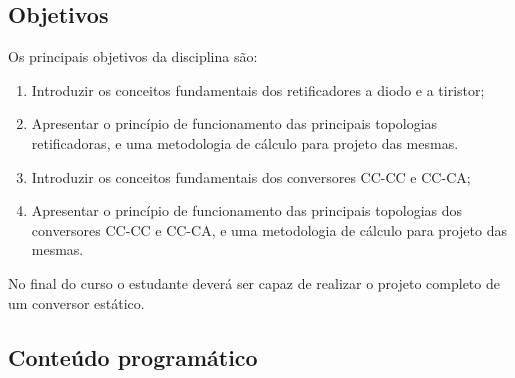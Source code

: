 \documentclass[
	article,			%
	12pt,				%
	twoside,			%
	a4paper,			%
	english,			%
	brazil,				%
	sumario=tradicional
]{abntex2-modelo-plano-de-aula}
\begin{document}
\begin{mdframed}[style=mdfexample2]	\center
	\section{Objetivos} %
\end{mdframed}

Os principais objetivos da disciplina são:

\begin{enumerate}
	\item Introduzir os conceitos fundamentais dos retificadores a diodo e a tiristor;	
	\item Apresentar o princípio de funcionamento das principais topologias retificadoras, e uma metodologia de cálculo para projeto das mesmas.
	\item Introduzir os conceitos fundamentais dos conversores CC-CC e CC-CA;
	\item Apresentar o princípio de funcionamento das principais topologias dos
	conversores CC-CC e CC-CA, e uma metodologia de cálculo para projeto das
	mesmas.
\end{enumerate}

No final do curso o estudante deverá ser capaz de realizar o projeto completo
de um conversor estático.

\hspace{1cm}

\begin{mdframed}[style=mdfexample2]	\center
	\section{Conteúdo programático} %
\end{mdframed}
\end{document}
